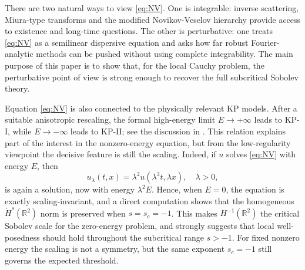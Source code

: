 \documentclass[a4paper,
11pt,  reqno]{amsart}
\newcommand{\5}{\textup{V}}
\theoremstyle{remark}
\newcommand{\R}{\mathbb{R}}
\numberwithin{equation}{section}
\numberwithin{theorem}{section}
\begin{document}
\medskip



There are two natural ways to view \eqref{eq:NV}. One is integrable: inverse scattering,
Miura-type transforms and the modified Novikov-Veselov hierarchy provide access to
existence and long-time questions. The other is perturbative: one treats \eqref{eq:NV} as
a semilinear dispersive equation and asks how far robust Fourier-analytic methods can be
pushed without using complete integrability. The main purpose of this paper is to show
that, for the local Cauchy problem, the perturbative point of view is strong enough to
recover the full subcritical Sobolev theory.

\medskip



Equation \eqref{eq:NV} is also connected to the physically relevant KP models. After a
suitable anisotropic rescaling, the formal high-energy limit $E\to +\infty$ leads to KP-I,
while $E\to -\infty$ leads to KP-II; see the discussion in
\cite{kazeykinamunoz1, kazeykinamunoz2}. This relation explains part of the interest in
the nonzero-energy equation, but from the low-regularity viewpoint the decisive feature is
still the scaling. Indeed, if $u$ solves \eqref{eq:NV} with energy $E$, then
\begin{equation}\label{scaling}
u_\lambda(t,x)=\lambda^2u(\lambda^3t,\lambda x),\quad \lambda>0,
\end{equation}
is again a solution, now with energy $\lambda^2E$. Hence, when $E=0$, the equation is
exactly scaling-invariant, and a direct computation shows that the homogeneous
$\dot H^s(\R^2)$ norm is preserved when $s=s_c=-1$. This makes $H^{-1}(\R^2)$ the
critical Sobolev scale for the zero-energy problem, and strongly suggests that local
well-posedness should hold throughout the subcritical range $s>-1$. For fixed nonzero
energy the scaling is not a symmetry, but the same exponent $s_c=-1$ still governs the
expected threshold.

\medskip
\end{document}

